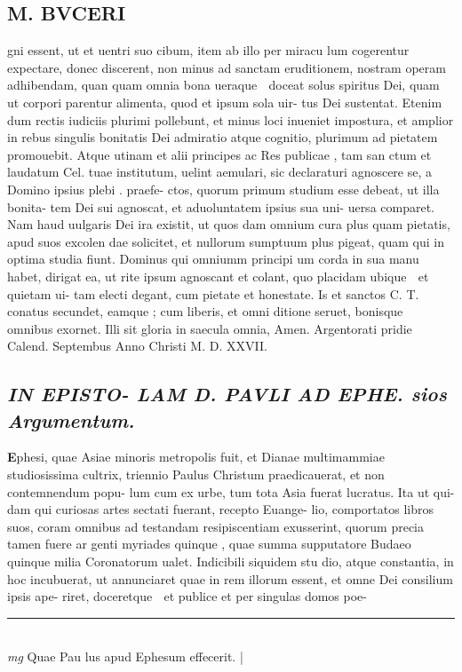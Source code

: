 \documentclass{article}
\begin{document}
\begin{pages}
\section*{M. BVCERI }\pstart gni essent, ut et uentri suo cibum, item ab illo per miracu lum cogerentur expectare, donec discerent, non minus ad sanctam eruditionem, nostram operam adhibendam, quan quam omnia bona ueraque  doceat solus spiritus Dei, quam ut corpori parentur alimenta, quod et ipsum sola uir- tus Dei sustentat.  Etenim dum rectis iudiciis plurimi pollebunt, et minus loci inueniet impostura, et amplior in rebus singulis bonitatis Dei admiratio atque cognitio, plurimum ad pietatem promouebit.   \pend\pstart Atque utinam et alii principes ac Res publicae , tam san ctum et laudatum Cel.  tuae institutum, uelint aemulari, sic declaraturi agnoscere se, a Domino ipsius plebi .  praefe- ctos, quorum primum studium esse debeat, ut illa bonita- tem Dei sui agnoscat, et aduoluntatem ipsius sua uni- uersa comparet. Nam haud uulgaris Dei ira existit, ut quos dam omnium cura plus quam pietatis, apud suos excolen dae solicitet, et nullorum sumptuum plus pigeat, quam qui in optima studia fiunt.  Dominus qui omniumm principi um corda in sua manu habet, dirigat ea, ut rite ipsum agnoscant et colant, quo placidam ubique  et quietam ui- tam electi degant, cum pietate et honestate.  Is et sanctos C. T.  conatus secundet, eamque ; cum liberis, et omni ditione seruet, bonisque  omnibus exornet.  Illi sit gloria in saecula omnia, Amen.  Argentorati pridie Calend.  Septembus   Anno Christi M. D. XXVII.  \pend
{}
{}
\subsection*{\textit{IN EPISTO- LAM D. PAVLI AD EPHE.  sios Argumentum.  }}\pstart \huge\textbf{E}\normalsize phesi, quae Asiae minoris metropolis fuit, et Dianae multimammiae studiosissima cultrix, triennio Paulus Christum praedicauerat, et non contemnendum popu- lum cum ex urbe, tum tota Asia fuerat lucratus.  Ita ut qui- dam qui curiosas artes sectati fuerant, recepto Euange- lio, comportatos libros suos, coram omnibus ad testandam resipiscentiam exusserint, quorum precia tamen fuere ar genti myriades quinque  , quae summa supputatore Budaeo quinque  milia Coronatorum ualet.  Indicibili siquidem stu dio, atque  constantia, in hoc incubuerat, ut annunciaret quae in rem illorum essent, et omne Dei consilium ipsis ape- riret, doceretque  et publice et per singulas domos poe-  \pend
\vspace{0.5cm}\noindent
\vspace{0.2cm}\rule{1cm}{0.2pt}\\ 
\hspace{0.2cm}\textit{mg}
\footnotesize Quae Pau lus apud Ephesum effecerit.  
\normalsize| 

\end{pages}
\end{document}
